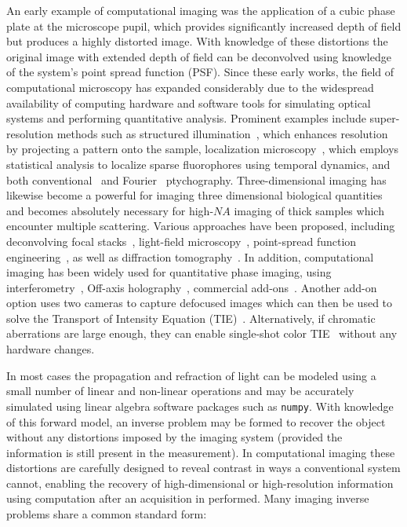 An early example of computational imaging was the application of a cubic phase plate at the microscope pupil, which provides significantly increased depth of field but produces a highly distorted image. With knowledge of these distortions the original image with extended depth of field can be deconvolved using knowledge of the system's point spread function (PSF)\cite{Dowski:95}. Since these early works, the field of computational microscopy has expanded considerably due to the widespread availability of computing hardware and software tools for simulating optical systems and performing quantitative analysis. Prominent examples include super-resolution methods such as structured illumination~\cite{gustafsson2000surpassing, gustafsson2005nonlinear}, which enhances resolution by projecting a pattern onto the sample, localization microscopy~\cite{betzig2006imaging, Rust:06}, which employs statistical analysis to localize sparse fluorophores using temporal dynamics, and both conventional~\cite{rodenburg2004phase} and Fourier~\cite{Zheng2013} ptychography. Three-dimensional imaging has likewise become a powerful for imaging three dimensional biological quantities and becomes absolutely necessary for high-$NA$ imaging of thick samples which encounter multiple scattering. Various approaches have been proposed, including deconvolving focal stacks~\cite{agard1984optical}, light-field microscopy~\cite{broxton2013wave, Ng2005}, point-spread function engineering~\cite{pavani2008three}, as well as diffraction tomography~\cite{wolf1969three, kim2014diffraction, maleki1992tomographic}. In addition, computational imaging has been widely used for quantitative phase imaging, using interferometry~\cite{Popescu2006,kim2014diffraction, Bhaduri:12}, Off-axis holography~\cite{Witte:12}, commercial add-ons~\cite{phasics,bon2012method}. Another add-on option uses two cameras to capture defocused images which can then be used to solve the Transport of Intensity Equation (TIE)~\cite{allman2005optical}. Alternatively, if chromatic aberrations are large enough, they can enable single-shot color TIE~\cite{wallerColorTIE} without any hardware changes.

In most cases the propagation and refraction of light can be modeled using a small number of linear and non-linear operations and may be accurately simulated using linear algebra software packages such as \texttt{numpy}. With knowledge of this forward model, an inverse problem may be formed to recover the object without any distortions imposed by the imaging system (provided the information is still present in the measurement). In computational imaging these distortions are carefully designed to reveal contrast in ways a conventional system cannot, enabling the recovery of high-dimensional or high-resolution information using computation after an acquisition in performed. Many imaging inverse problems share a common standard form:

